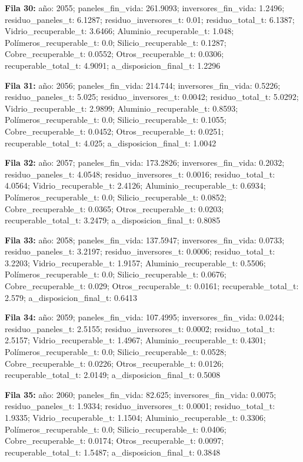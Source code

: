 {\footnotesize\textbf{Fila 30:} año: 2055; paneles\_fin\_vida: 261.9093; inversores\_fin\_vida: 1.2496; residuo\_paneles\_t: 6.1287; residuo\_inversores\_t: 0.01; residuo\_total\_t: 6.1387; Vidrio\_recuperable\_t: 3.6466; Aluminio\_recuperable\_t: 1.048; Polímeros\_recuperable\_t: 0.0; Silicio\_recuperable\_t: 0.1287; Cobre\_recuperable\_t: 0.0552; Otros\_recuperable\_t: 0.0306; recuperable\_total\_t: 4.9091; a\_disposicion\_final\_t: 1.2296\par}
{\footnotesize\textbf{Fila 31:} año: 2056; paneles\_fin\_vida: 214.744; inversores\_fin\_vida: 0.5226; residuo\_paneles\_t: 5.025; residuo\_inversores\_t: 0.0042; residuo\_total\_t: 5.0292; Vidrio\_recuperable\_t: 2.9899; Aluminio\_recuperable\_t: 0.8593; Polímeros\_recuperable\_t: 0.0; Silicio\_recuperable\_t: 0.1055; Cobre\_recuperable\_t: 0.0452; Otros\_recuperable\_t: 0.0251; recuperable\_total\_t: 4.025; a\_disposicion\_final\_t: 1.0042\par}
{\footnotesize\textbf{Fila 32:} año: 2057; paneles\_fin\_vida: 173.2826; inversores\_fin\_vida: 0.2032; residuo\_paneles\_t: 4.0548; residuo\_inversores\_t: 0.0016; residuo\_total\_t: 4.0564; Vidrio\_recuperable\_t: 2.4126; Aluminio\_recuperable\_t: 0.6934; Polímeros\_recuperable\_t: 0.0; Silicio\_recuperable\_t: 0.0852; Cobre\_recuperable\_t: 0.0365; Otros\_recuperable\_t: 0.0203; recuperable\_total\_t: 3.2479; a\_disposicion\_final\_t: 0.8085\par}
{\footnotesize\textbf{Fila 33:} año: 2058; paneles\_fin\_vida: 137.5947; inversores\_fin\_vida: 0.0733; residuo\_paneles\_t: 3.2197; residuo\_inversores\_t: 0.0006; residuo\_total\_t: 3.2203; Vidrio\_recuperable\_t: 1.9157; Aluminio\_recuperable\_t: 0.5506; Polímeros\_recuperable\_t: 0.0; Silicio\_recuperable\_t: 0.0676; Cobre\_recuperable\_t: 0.029; Otros\_recuperable\_t: 0.0161; recuperable\_total\_t: 2.579; a\_disposicion\_final\_t: 0.6413\par}
{\footnotesize\textbf{Fila 34:} año: 2059; paneles\_fin\_vida: 107.4995; inversores\_fin\_vida: 0.0244; residuo\_paneles\_t: 2.5155; residuo\_inversores\_t: 0.0002; residuo\_total\_t: 2.5157; Vidrio\_recuperable\_t: 1.4967; Aluminio\_recuperable\_t: 0.4301; Polímeros\_recuperable\_t: 0.0; Silicio\_recuperable\_t: 0.0528; Cobre\_recuperable\_t: 0.0226; Otros\_recuperable\_t: 0.0126; recuperable\_total\_t: 2.0149; a\_disposicion\_final\_t: 0.5008\par}
{\footnotesize\textbf{Fila 35:} año: 2060; paneles\_fin\_vida: 82.625; inversores\_fin\_vida: 0.0075; residuo\_paneles\_t: 1.9334; residuo\_inversores\_t: 0.0001; residuo\_total\_t: 1.9335; Vidrio\_recuperable\_t: 1.1504; Aluminio\_recuperable\_t: 0.3306; Polímeros\_recuperable\_t: 0.0; Silicio\_recuperable\_t: 0.0406; Cobre\_recuperable\_t: 0.0174; Otros\_recuperable\_t: 0.0097; recuperable\_total\_t: 1.5487; a\_disposicion\_final\_t: 0.3848\par}
